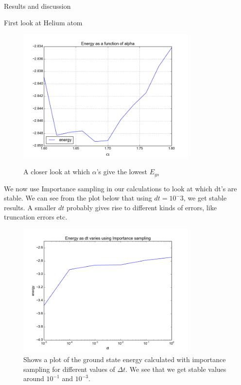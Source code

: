 \documentclass[a4paper, 12pt, titlepage]{article}
\begin{document}
\begin{section}{Results and discussion}
\begin{subsection}{First look at Helium atom}
 \begin{figure}[H]
 	\centering
 	\includegraphics[width=0.8\textwidth]{../python_programs/EnergyVariance_helium2.png}
 	\label{Helium2}
	\caption{A closer look at which $\alpha$'s give the lowest $E_{gs}$}
 \end{figure}

 We now use Importance sampling in our calculations to look at which dt's are stable. 
 We can see from the plot below that using $dt = 10^-3$, we get stable results. A smaller $dt$ probably gives rise to different kinds of errors, like truncation errors etc.  
 \begin{figure}[H] 
 	\centering
 	\includegraphics[width=0.8\textwidth]{../python_programs/ImportanceSampling_Helium_dt.png}
 	\caption{Shows a plot of the ground state energy calculated with importance sampling for different values of $\Delta t$. We see that we get stable values around $10^{-1}$ and $10^{-3}$. }
 \end{figure}


\end{subsection}
\end{section}
\end{document}
